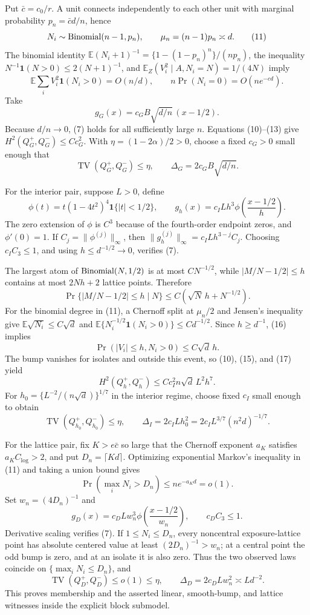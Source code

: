 Put \(\bar c=c_0/r\).  A unit connects independently to each other unit with marginal probability \(p_n=\bar c d/n\), hence
\[
 N_i\sim{\rm Binomial}(n-1,p_n),
 \qquad \mu_n=(n-1)p_n\asymp d.
\tag{11}
\]
The binomial identity \(\mathbb E(N_i+1)^{-1}=\{1-(1-p_n)^n\}/(np_n)\), the inequality \(N^{-1}\mathbf1(N>0)\leq2(N+1)^{-1}\), and \(\mathbb E_Z(V_i^2\mid A,N_i=N)=1/(4N)\) imply
\[
 \mathbb E\sum_iV_i^2\mathbf1(N_i>0)=O(n/d),
 \qquad n\Pr(N_i=0)=O(ne^{-cd}).
\tag{12}
\]
Take
\[
 g_G(x)=c_GB\sqrt{d/n}\,(x-1/2).
\tag{13}
\]
Because \(d/n\to0\), (7) holds for all sufficiently large \(n\).  Equations (10)--(13) give \(H^2(Q_G^+,Q_G^-)\leq Cc_G^2\).  With \(\eta=(1-2\alpha)/2>0\), choose a fixed \(c_G>0\) small enough that
\[
 \operatorname{TV}(Q_G^+,Q_G^-)\leq\eta,
 \qquad \Delta_G=2c_GB\sqrt{d/n}.
\tag{14}
\]

For the interior pair, suppose \(L>0\), define
\[
 \phi(t)=t(1-4t^2)^4\mathbf1\{|t|<1/2\},
 \qquad g_h(x)=c_ILh^3\phi\!\left(\frac{x-1/2}{h}\right).
\tag{15}
\]
The zero extension of \(\phi\) is \(C^3\) because of the fourth-order endpoint zeros, and \(\phi'(0)=1\).  If \(C_j=\|\phi^{(j)}\|_\infty\), then \(\|g_h^{(j)}\|_\infty=c_ILh^{3-j}C_j\).  Choosing \(c_IC_3\leq1\), and using \(h\leq d^{-1/2}\to0\), verifies (7).

The largest atom of \({\rm Binomial}(N,1/2)\) is at most \(CN^{-1/2}\), while \(|M/N-1/2|\leq h\) contains at most \(2Nh+2\) lattice points.  Therefore
\[
 \Pr\{|M/N-1/2|\leq h\mid N\}\leq C(\sqrt N\,h+N^{-1/2}).
\tag{16}
\]
For the binomial degree in (11), a Chernoff split at \(\mu_n/2\) and Jensen's inequality give \(\mathbb E\sqrt{N_i}\leq C\sqrt d\) and \(\mathbb E\{N_i^{-1/2}\mathbf1(N_i>0)\}\leq Cd^{-1/2}\).  Since \(h\geq d^{-1}\), (16) implies
\[
 \Pr(|V_i|\leq h,N_i>0)\leq C\sqrt d\,h.
\tag{17}
\]
The bump vanishes for isolates and outside this event, so (10), (15), and (17) yield
\[
 H^2(Q_h^+,Q_h^-)\leq Cc_I^2n\sqrt d\,L^2h^7.
\tag{18}
\]
For \(h_0=\{L^{-2}/(n\sqrt d)\}^{1/7}\) in the interior regime, choose fixed \(c_I\) small enough to obtain
\[
 \operatorname{TV}(Q_{h_0}^+,Q_{h_0}^-)\leq\eta,
 \qquad \Delta_I=2c_ILh_0^2
 =2c_IL^{3/7}(n^2d)^{-1/7}.
\tag{19}
\]

For the lattice pair, fix \(K>e\bar c\) so large that the Chernoff exponent \(a_K\) satisfies \(a_KC_{\log}>2\), and put \(D_n=\lceil Kd\rceil\).  Optimizing exponential Markov's inequality in (11) and taking a union bound gives
\[
 \Pr(\max_iN_i>D_n)\leq ne^{-a_Kd}=o(1).
\tag{20}
\]
Set \(w_n=(4D_n)^{-1}\) and
\[
 g_D(x)=c_DLw_n^3\phi\!\left(\frac{x-1/2}{w_n}\right),
 \qquad c_DC_3\leq1.
\tag{21}
\]
Derivative scaling verifies (7).  If \(1\leq N_i\leq D_n\), every noncentral exposure-lattice point has absolute centered value at least \((2D_n)^{-1}>w_n\); at a central point the odd bump is zero, and at an isolate it is also zero.  Thus the two observed laws coincide on \(\{\max_iN_i\leq D_n\}\), and
\[
 \operatorname{TV}(Q_D^+,Q_D^-)\leq o(1)\leq\eta,
 \qquad \Delta_D=2c_DLw_n^2\asymp Ld^{-2}.
\tag{22}
\]
This proves membership and the asserted linear, smooth-bump, and lattice witnesses inside the explicit block submodel.

